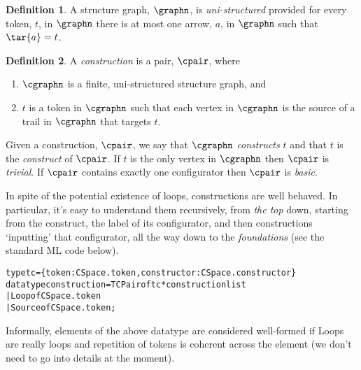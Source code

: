 \documentclass[a4paper]{article}
\theoremstyle{definition}
\newtheorem{definition}{Definition}
\begin{document}
		\begin{definition}\label{defn:uniStructured}
			A structure graph, $\graphn$, is \textit{uni-structured} provided for every token, $t$, in $\graphn$ there is at most one arrow, $a$, in $\graphn$ such that $\tar{a}= t$.
		\end{definition}
	
		
		\begin{definition}\label{defn:construction}
			A \textit{construction} is a pair, $\cpair$, where
			\begin{enumerate}[itemsep=0pt,topsep=4pt]
				\item  $\cgraphn$ is a finite, uni-structured structure graph, and
				\item $t$ is a token in $\cgraphn$ such that each vertex in $\cgraphn$ is the source of a trail in $\cgraphn$ that targets $t$.
			\end{enumerate}
			Given a construction, $\cpair$, we say that $\cgraphn$ \textit{constructs} $t$ and that $t$ is the \textit{construct} of $\cpair$. If $t$ is the only vertex in $\cgraphn$ then $\cpair$ is \textit{trivial}. If $\cpair$ contains exactly one configurator then $\cpair$ is \textit{basic}.
		\end{definition}
		
	
		In spite of the potential existence of loops, constructions are well behaved. In particular, it's easy to understand them recursively, from \textit{the top} down, starting from the construct, the label of its configurator, and then constructions `inputting' that configurator, all the way down to the \textit{foundations} (see the standard ML code below).
\begin{alltt}
type tc = \{token : CSpace.token, constructor : CSpace.constructor\}
datatype construction = TCPair of tc * construction list
                      | Loop of CSpace.token
                      | Source of CSpace.token ;
\end{alltt}
		Informally, elements of the above datatype are considered well-formed if Loops are really loops and repetition of tokens is coherent across the element (we don't need to go into details at the moment).
		
\end{document}
